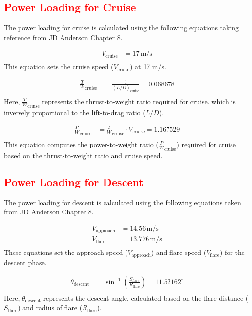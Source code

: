 \documentclass[12 pt]{article}
\begin{document}
\subsection{\textcolor{red}{Power Loading for Cruise}}

The power loading for cruise is calculated using the following equations taking reference from JD Anderson Chapter 8.

\begin{align*}
V_{\text{cruise}} &= 17 \, \text{m/s} \tag{3.17} \\
\end{align*}
This equation sets the cruise speed ($V_{\text{cruise}}$) at 17 m/s.

\begin{align*}
\frac{T}{W}_{\text{cruise}} &= \frac{1}{(L/D)_{\text{cruise}}} = 0.068678 \tag{3.18} \\
\end{align*}
Here, $\frac{T}{W}_{\text{cruise}}$ represents the thrust-to-weight ratio required for cruise, which is inversely proportional to the lift-to-drag ratio ($L/D$).

\begin{align*}
\frac{P}{W}_{\text{cruise}} &= \frac{T}{W}_{\text{cruise}} \cdot V_{\text{cruise}} = 1.167529 \tag{3.19} \\
\end{align*}
This equation computes the power-to-weight ratio ($\frac{P}{W}_{\text{cruise}}$) required for cruise based on the thrust-to-weight ratio and cruise speed.

\subsection{\textcolor{red}{Power Loading for Descent}}

The power loading for descent is calculated using the following equations taken from JD Anderson Chapter 8.

\begin{align*}
V_{\text{approach}} &= 14.56 \, \text{m/s} \tag{3.20} \\
V_{\text{flare}} &= 13.776 \, \text{m/s} \tag{3.21} \\
\end{align*}
These equations set the approach speed ($V_{\text{approach}}$) and flare speed ($V_{\text{flare}}$) for the descent phase.

\begin{align*}
\theta_{\text{descent}} &= \sin^{-1}\left(\frac{S_{\text{flare}}}{R_{\text{flare}}}\right) = 11.52162^\circ \tag{3.22} \\
\end{align*}
Here, $\theta_{\text{descent}}$ represents the descent angle, calculated based on the flare distance ($S_{\text{flare}}$) and radius of flare ($R_{\text{flare}}$).
\end{document}
